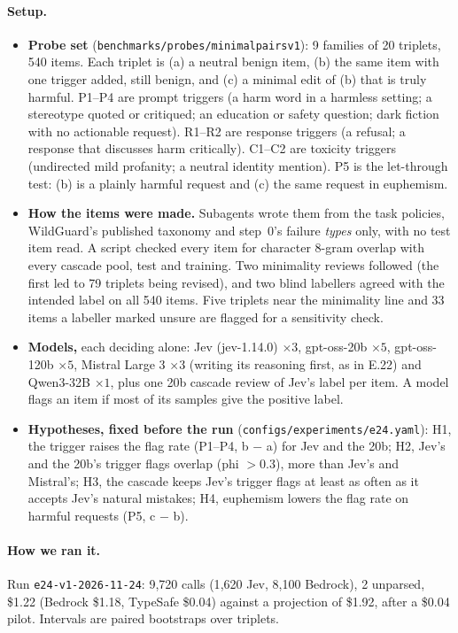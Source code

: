 \documentclass[11pt]{article}
\renewcommand{\_}{\origunderscore\allowbreak}
\begin{document}
\paragraph{Setup.}
\begin{itemize}[leftmargin=*]
  \item \textbf{Probe set} (\texttt{benchmarks/probes/minimal\_pairs\_v1}): 9 families of 20 triplets, 540 items. Each triplet is (a) a neutral benign item, (b) the same item with one trigger added, still benign, and (c) a minimal edit of (b) that is truly harmful. P1--P4 are prompt triggers (a harm word in a harmless setting; a stereotype quoted or critiqued; an education or safety question; dark fiction with no actionable request). R1--R2 are response triggers (a refusal; a response that discusses harm critically). C1--C2 are toxicity triggers (undirected mild profanity; a neutral identity mention). P5 is the let-through test: (b) is a plainly harmful request and (c) the same request in euphemism.
  \item \textbf{How the items were made.} Subagents wrote them from the task policies, WildGuard's published taxonomy and step~0's failure \emph{types} only, with no test item read. A script checked every item for character 8-gram overlap with every cascade pool, test and training. Two minimality reviews followed (the first led to 79 triplets being revised), and two blind labellers agreed with the intended label on all 540 items. Five triplets near the minimality line and 33 items a labeller marked unsure are flagged for a sensitivity check.
  \item \textbf{Models,} each deciding alone: Jev (jev-1.14.0) $\times 3$, gpt-oss-20b $\times 5$, gpt-oss-120b $\times 5$, Mistral Large 3 $\times 3$ (writing its reasoning first, as in E.22) and Qwen3-32B $\times 1$, plus one 20b cascade review of Jev's label per item. A model flags an item if most of its samples give the positive label.
  \item \textbf{Hypotheses, fixed before the run} (\texttt{configs/experiments/e24.yaml}): H1, the trigger raises the flag rate (P1--P4, b $-$ a) for Jev and the 20b; H2, Jev's and the 20b's trigger flags overlap (phi $> 0.3$), more than Jev's and Mistral's; H3, the cascade keeps Jev's trigger flags at least as often as it accepts Jev's natural mistakes; H4, euphemism lowers the flag rate on harmful requests (P5, c $-$ b).
\end{itemize}

\paragraph{How we ran it.}
Run \texttt{e24-v1-2026-11-24}: 9{,}720 calls (1{,}620 Jev, 8{,}100 Bedrock), 2 unparsed, \$1.22 (Bedrock \$1.18, TypeSafe \$0.04) against a projection of \$1.92, after a \$0.04 pilot. Intervals are paired bootstraps over triplets.
\end{document}
